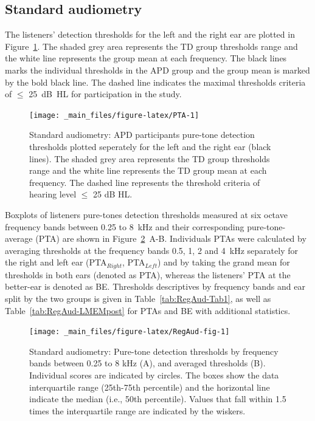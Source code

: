 \documentclass[a4paper, twoside]{templates/ociamthesis}
\begin{document}
\hypertarget{standard-audiometry}{%
\subsection{Standard audiometry}\label{standard-audiometry}}

The listeners' detection thresholds for the left and the right ear are plotted in Figure~\ref{fig:PTA}. The shaded grey area represents the TD group thresholds range and the white line represents the group mean at each frequency. The black lines marks the individual thresholds in the APD group and the group mean is marked by the bold black line. The dashed line indicates the maximal thresholds criteria of \(\leq\) 25~dB~HL for participation in the study.\\

\begin{figure}

{\centering \texttt{[image: \_main\_files/figure-latex/PTA-1]} 

}

\caption{Standard audiometry: APD participants pure-tone detection thresholds plotted seperately for the left and the right ear (black lines). The shaded grey area represents the TD group thresholds range and the white line represents the TD group mean at each frequency. The dashed line represents the threshold criteria of hearing level $\leq$ 25 dB HL.}\label{fig:PTA}
\end{figure}

Boxplots of listeners pure-tones detection thresholds measured at six octave frequency bands between 0.25 to 8~kHz and their corresponding pure-tone-average (PTA) are shown in Figure~\ref{fig:RegAud-fig}~A-B. Individuals PTAs were calculated by averaging thresholds at the frequency bands 0.5, 1, 2 and 4~kHz separately for the right and left ear (PTA\(_{Right}\), PTA\(_{Left}\)) and by taking the grand mean for thresholds in both ears (denoted as PTA), whereas the listeners' PTA at the better-ear is denoted as BE. Thresholds descriptives by frequency bands and ear split by the two groups is given in Table~\ref{tab:RegAud-Tab1}, as well as Table~\ref{tab:RegAud-LMEMpost} for PTAs and BE with additional statistics.\\

\begin{figure}

{\centering \texttt{[image: \_main\_files/figure-latex/RegAud-fig-1]} 

}

\caption{Standard audiometry: Pure-tone detection thresholds by frequency bands between 0.25 to 8 kHz (A), and averaged thresholds (B). Individual scores are indicated by circles. The boxes show the data interquartile range (25th-75th percentile) and the horizontal line indicate the median (i.e., 50th percentile). Values that fall within 1.5 times the interquartile range are indicated by the wiskers.}\label{fig:RegAud-fig}
\end{figure}
\end{document}
